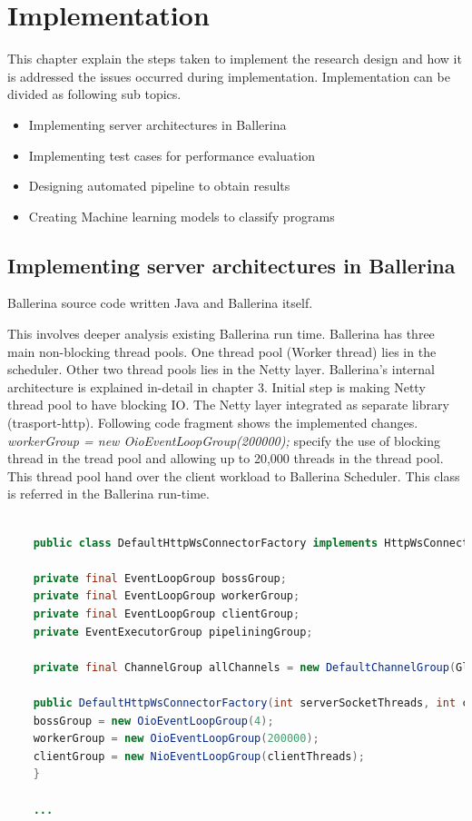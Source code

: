 \chapter{Implementation}

This chapter explain the steps taken to implement the research design and how it is addressed the issues occurred during implementation. Implementation can be divided as following sub topics.

\begin{itemize}
	\item Implementing server architectures in Ballerina
	\item Implementing test cases for performance evaluation
	\item Designing automated pipeline to obtain results
	\item Creating Machine learning models to classify programs
\end{itemize}

\section{Implementing server architectures in Ballerina}

Ballerina source code written Java and Ballerina itself.

This involves deeper analysis existing Ballerina run time. Ballerina has three main non-blocking thread pools. One thread pool (Worker thread) lies in the scheduler. Other two thread pools lies in the Netty layer. Ballerina's internal architecture is explained in-detail in chapter 3. Initial step is making Netty thread pool to have blocking IO.
The Netty layer integrated as separate library (trasport-http)\cite{transport-http}. Following code fragment shows the implemented changes.  \textit{workerGroup = new OioEventLoopGroup(200000);} specify the use of blocking thread in the tread pool and allowing up to 20,000 threads in the thread pool. This thread pool hand over the client workload to Ballerina Scheduler. This class is referred in the Ballerina run-time.

\begin{lstlisting}[language=Java]

	public class DefaultHttpWsConnectorFactory implements HttpWsConnectorFactory {
	
	private final EventLoopGroup bossGroup;
	private final EventLoopGroup workerGroup;
	private final EventLoopGroup clientGroup;
	private EventExecutorGroup pipeliningGroup;
	
	private final ChannelGroup allChannels = new DefaultChannelGroup(GlobalEventExecutor.INSTANCE);
	
	public DefaultHttpWsConnectorFactory(int serverSocketThreads, int childSocketThreads, int clientThreads) {
	bossGroup = new OioEventLoopGroup(4);
	workerGroup = new OioEventLoopGroup(200000);
	clientGroup = new NioEventLoopGroup(clientThreads);
	}
	
	...
\end{lstlisting}


